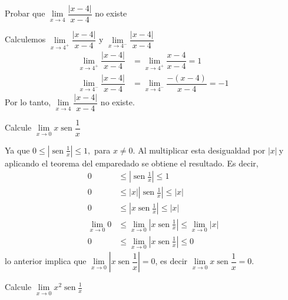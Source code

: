 \begin{example}
Probar que $\lim\limits_{x\rightarrow4}\dfrac{\left|  x-4\right|  } {x-4}$ no existe
\end{example}

\begin{sol}
Calculemos $\lim\limits_{x\rightarrow4^{+}}\dfrac{\left|  x-4\right|  }{x-4}$
y $\lim\limits_{x\rightarrow4^{-}}\dfrac{\left|  x-4\right|  }{x-4}$%
\begin{align*}
\lim\limits_{x\rightarrow4^{+}}\dfrac{\left|  x-4\right|  }{x-4}  &
=\lim\limits_{x\rightarrow4^{+}}\dfrac{x-4}{x-4}=1\\
\lim\limits_{x\rightarrow4^{-}}\dfrac{\left|  x-4\right|  }{x-4}  &
=\lim\limits_{x\rightarrow4^{-}}\dfrac{-\left(  x-4\right)  }{x-4}=-1
\end{align*}
Por lo tanto, $\lim\limits_{x\rightarrow4}\dfrac{\left|  x-4\right|  }{x-4}$
no existe.
\end{sol}

\begin{example}
Calcule $\lim\limits_{x\rightarrow0}x\operatorname{sen}\dfrac{1}{x}$
\end{example}

\begin{sol}
Ya que $0\leq\left|  \operatorname{sen}\frac{1}{x}\right|  \leq1,$ para
$x\neq0.$ Al multiplicar esta desigualdad por $\left|  x\right|  \ $y
aplicando el teorema del emparedado se obtiene el resultado. Es decir,%
\begin{align*}
0  &  \leq\left|  \operatorname{sen}\frac{1}{x}\right|  \leq1\\
0  &  \leq\left|  x\right|  \left|  \operatorname{sen}\frac{1}{x}\right|
\leq\left|  x\right| \\
0  &  \leq\left|  x\operatorname{sen}\frac{1}{x}\right|  \leq\left|  x\right|
\\
\lim\limits_{x\rightarrow0}0  &  \leq\lim\limits_{x\rightarrow0}\left|
x\operatorname{sen}\frac{1}{x}\right|  \leq\lim\limits_{x\rightarrow0}\left|
x\right| \\
0  &  \leq\lim\limits_{x\rightarrow0}\left|  x\operatorname{sen}\frac{1}%
{x}\right|  \leq0
\end{align*}
lo anterior implica que $\lim\limits_{x\rightarrow0}\left|
x\operatorname{sen}\dfrac{1}{x}\right|  =0$, es decir $\lim
\limits_{x\rightarrow0}x\operatorname{sen}\dfrac{1}{x}=0.$
\end{sol}

\begin{example}
Calcule $\lim\limits_{x\rightarrow0}x^{2}\operatorname{sen}\frac{1}{x}$
\end{example}

